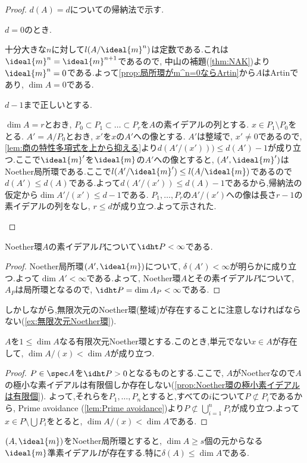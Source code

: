 \begin{proof}
	$d(A)=d$についての帰納法で示す.
	\begin{step}
		\item $d=0$のとき.
		
		十分大きな$n$に対して$l(A/\ideal{m}^n)$は定数である.これは$\ideal{m}^n=\ideal{m}^{n+1}$であるので, 中山の補題(\ref{thm:NAK})より$\ideal{m}^n=0$である.よって\ref{prop:局所環がm^n=0ならArtin}から$A$はArtinであり, $\dim A=0$である.
		
		\item $d-1$まで正しいとする.
		
		$\dim A=r$とおき, $P_0\subset P_1\subset\dots\subset P_r$を$A$の素イデアルの列とする. $x\in P_1\setminus P_0$をとる. $A'=A/P_0$とおき, $x'$を$x$の$A'$への像とする. $A'$は整域で, $x'\neq0$であるので, \ref{lem:商の特性多項式を上から抑える}より$d(A'/(x')))\leq d(A')-1$が成り立つ.ここで$\ideal{m}'$を$\ideal{m}$の$A'$への像とすると, $(A',\ideal{m}')$はNoether局所環である.ここで$l(A'/\ideal{m}')\leq l(A/\ideal{m})$であるので$d(A')\leq d(A)$である.よって$d(A'/(x'))\leq d(A)-1$であるから,帰納法の仮定から$\dim A'/(x')\leq d-1$である. $P_1,\dots,P_r$の$A'/(x')$への像は長さ$r-1$の素イデアルの列をなし, $r\leq d$が成り立つ.よって示された.
	\end{step}
\end{proof}

\begin{cor}
	Noether環$A$の素イデアル$P$について$\idht P<\infty$である.
\end{cor}

\begin{proof}
	Noether局所環$(A',\ideal{m})$について, $\delta(A')<\infty$が明らかに成り立つ.よって$\dim A'<\infty$である.よって, Noether環$A$とその素イデアル$P$について, $A_P$は局所環となるので, $\idht P=\dim A_P<\infty$である.
\end{proof}

しかしながら,無限次元のNoether環(整域)が存在することに注意しなければならない(\ref{ex:無限次元Noether環}).

\begin{lem}
	$A$を$1\leq\dim A$なる有限次元Noether環とする.このとき,単元でない$x\in A$が存在して, $\dim A/(x)<\dim A$が成り立つ.
\end{lem}

\begin{proof}
	$P\in\spec A$を$\idht P>0$となるものとする.ここで, $A$がNoetherなので$A$の極小な素イデアルは有限個しか存在しない(\ref{prop:Noether環の極小素イデアルは有限個}). よって,それらを$P_1,\dots, P_n$とすると,すべての$i$について$P\not\subset P_i$であるから, Prime avoidance (\ref{lem:Prime avoidance})より$P\not\subset\bigcup_{i=1}^nP_i$が成り立つ.よって$x\in P\setminus\bigcup P_i$をとると, $\dim A/(x)<\dim A$である.

\end{proof}
\begin{prop}\label{prop:dim A geq delta(A)}
	$(A,\ideal{m})$をNoether局所環とすると, $\dim A\geq s$個の元からなる$\ideal{m}$準素イデアル$I$が存在する.特に$\delta(A)\leq\dim A$である.
\end{prop}

